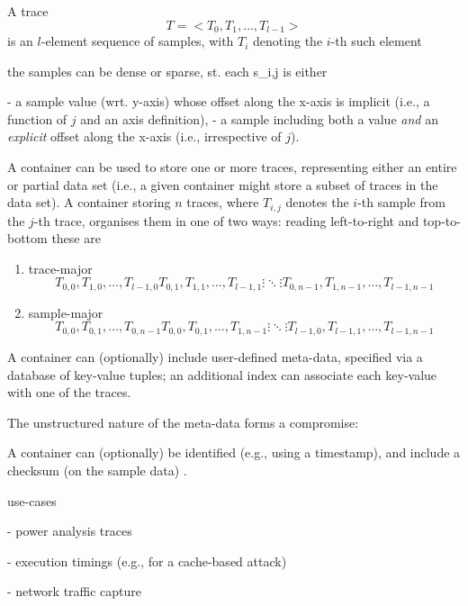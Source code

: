 \documentclass[10pt,a4paper]{llncs}
\begin{document}

A trace 
\[
T = < T_0, T_1, \ldots, T_{l-1} >
\]
is an $l$-element sequence of samples, with $T_i$ denoting the $i$-th such
element

the samples can be dense or sparse, st. each s_{i,j} is either

- a sample value (wrt. y-axis) whose offset along the x-axis is implicit 
  (i.e., a function of $j$ and an axis definition),
- a sample including both a value {\em and} an {\em explicit} offset along 
  the x-axis (i.e., irrespective of $j$).

A container can be used to store one or more traces, representing either an
entire or partial data set (i.e., a given container might store a subset of 
traces in the data set).  A container storing $n$ traces, where $T_{i,j}$ 
denotes the $i$-th sample from the $j$-th trace, organises them in one of 
two ways: reading left-to-right and top-to-bottom these are

\begin{enumerate}
\item trace-major 
      \[
      T_{  0,  0}, T_{  1,  0}, \ldots, T_{l-1,  0}
      T_{  0,  1}, T_{  1,  1}, \ldots, T_{l-1,  1}
      \vdots                    \ddots  \vdots
      T_{  0,n-1}, T_{  1,n-1}, \ldots, T_{l-1,n-1}
      \]
\item sample-major
      \[
      T_{  0,  0}, T_{  0,  1}, \ldots, T_{  0,n-1}
      T_{  0,  0}, T_{  0,  1}, \ldots, T_{  1,n-1}
      \vdots                    \ddots  \vdots
      T_{l-1,  0}, T_{l-1,  1}, \ldots, T_{l-1,n-1}
      \]
\end{enumerate}

\item A container can (optionally) include user-defined meta-data, specified
      via a database of key-value tuples; an additional index can associate 
      each key-value with one of the traces.  

      The unstructured nature of the meta-data forms a compromise: 

\item A container can (optionally) be identified (e.g., using a timestamp),  
      and include a checksum (on the sample data) .


use-cases

- power analysis traces

- execution timings (e.g., for a cache-based attack)

- network traffic capture

\end{document}
